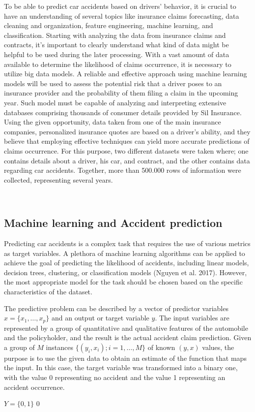 \documentclass{IEEEtran}
\begin{document}
To be able to predict car accidents based on drivers' behavior, it is crucial to have an understanding of several topics like insurance claims forecasting, data cleaning and organization, feature engineering, machine learning, and classification. Starting with analyzing the data from insurance claims and contracts, it's important to clearly understand what kind of data might be helpful to be used during the later processing. With a vast amount of data available to determine the likelihood of claims occurrence, it is necessary to utilize big data models. A reliable and effective approach using machine learning models will be used to assess the potential risk that a driver poses to an insurance provider and the probability of them filing a claim in the upcoming year. Such model must be capable of analyzing and interpreting extensive databases comprising thousands of consumer details provided by Sil Insurance. Using the given opportunity, data taken from one of the main insurance companies, personalized insurance quotes are based on a driver's ability, and they believe that employing effective techniques can yield more accurate predictions of claims occurrence. For this purpose, two different datasets were taken where; one contains details about a driver, his car, and contract, and the other contains data regarding car accidents. Together, more than 500.000 rows of information were collected, representing several years.

\

\subsection{Machine learning and Accident prediction}


Predicting car accidents is a complex task that requires the use of various metrics as target variables. A plethora of machine learning algorithms can be applied to achieve the goal of predicting the likelihood of accidents, including linear models, decision trees, clustering, or classification models (Nguyen et al. 2017). However, the most appropriate model for the task should be chosen based on the specific characteristics of the dataset.

The predictive problem can be described by a vector of predictor variables $x = \{x_1, \ldots, x_p\}$ and an output or target variable $y$. The input variables are represented by a group of quantitative and qualitative features of the automobile and the policyholder, and the result is the actual accident claim prediction. Given a group of $M$ instances $\{(y_i, x_i); i = 1, \ldots, M\}$ of known $(y, x)$ values, the purpose is to use the given data to obtain an estimate of the function that maps the input. In this case, the target variable was transformed into a binary one, with the value 0 representing no accident and the value 1 representing an accident occurrence.
\begin{center}
    $Y = \{0,1\}$ 0\
\end{center}
\end{document}
